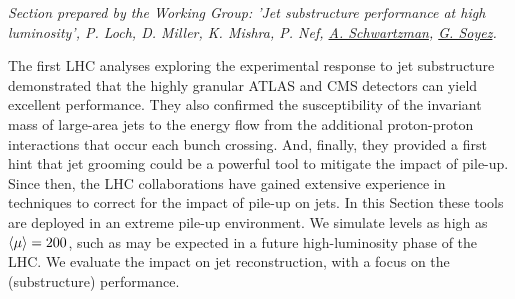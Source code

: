 

{\it Section prepared by the Working Group: 'Jet substructure performance at high luminosity', P. Loch, D. Miller, K. Mishra,  P. Nef, \underline{A. Schwartzman}, \underline{G. Soyez}.
}







The first LHC analyses exploring the experimental response to jet substructure
demonstrated that the highly granular ATLAS and CMS detectors can yield 
excellent performance. They also confirmed the susceptibility of 
the invariant mass of large-area jets to the energy flow from the 
additional proton-proton interactions that occur each bunch crossing. 
And, finally, they provided a first hint that jet grooming could be a 
powerful tool to mitigate the impact of pile-up. Since then, the LHC
collaborations have gained extensive experience in techniques 
to correct for the impact of pile-up on jets. In this Section 
these tools are deployed in an extreme pile-up environment. 
We simulate \pu{} levels as high as $\langle\mu\rangle = 200$, such as may be
expected in a future high-luminosity phase of the LHC. We evaluate
the impact on jet reconstruction, with a focus on the (substructure) 
performance.


